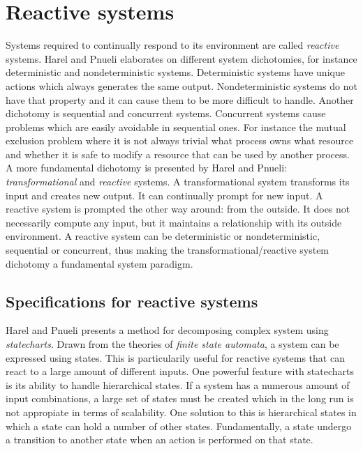 \section{Reactive systems}

Systems required to continually respond to its environment are called
\textit{reactive} systems. Harel and Pnueli \cite{harel1985development}
elaborates on different system dichotomies, for instance deterministic and
nondeterministic systems. Deterministic systems have unique actions which
always generates the same output. Nondeterministic systems do not have that
property and it can cause them to be more difficult to handle. Another
dichotomy is sequential and concurrent systems. Concurrent systems cause
problems which are easily avoidable in sequential ones. For instance the mutual
exclusion problem where it is not always trivial what process owns what
resource and whether it is safe to modify a resource that can be used by
another process. A more fundamental dichotomy is presented by Harel and Pnueli:
\textit{transformational} and \textit{reactive} systems. A transformational
system transforms its input and creates new output. It can continually prompt
for new input. A reactive system is prompted the other way around: from the
outside. It does not necessarily compute any input, but it maintains a
relationship with its outside environment. A reactive system can be
deterministic or nondeterministic, sequential or concurrent, thus making the
transformational/reactive system dichotomy a fundamental system paradigm.
\cite{harel1985development}

\subsection{Specifications for reactive systems}

Harel and Pnueli \cite{harel1985development} presents a method for decomposing
complex system using \textit{statecharts}. Drawn from the theories of
\textit{finite state automata}, a system can be expressed using states. This is
particularily useful for reactive systems that can react to a large amount of
different inputs. One powerful feature with statecharts is its ability to
handle hierarchical states. If a system has a numerous amount of input
combinations, a large set of states must be created which in the long run is
not appropiate in terms of scalability. One solution to this is hierarchical
states in which a state can hold a number of other states. Fundamentally, a
state undergo a transition to another state when an action is performed on that
state. \cite{harel1985development}

